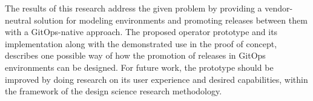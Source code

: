 The results of this research
address the given problem
by providing a vendor-neutral solution
for modeling environments and promoting releases between them
with a GitOps-native approach.
The proposed operator prototype and its implementation along with
the demonstrated use in the proof of concept,
describes one possible way of how the promotion of releases
in GitOps environments can be designed.
For future work, the prototype should be improved
by doing research on its user experience and desired capabilities,
within the framework of
the design science research methodology.
























